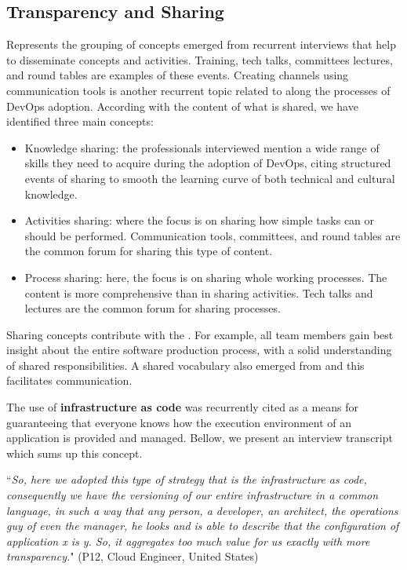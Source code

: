 \subsection{Transparency and Sharing} Represents the grouping of concepts
emerged from recurrent interviews that help to disseminate concepts and
activities. Training, tech talks, committees lectures, and round tables
are examples of these events. Creating
channels using communication tools is another recurrent topic
related to  along the processes of DevOps adoption.
According with the content of what is shared, we
have identified three main concepts:

\begin{itemize}
\item Knowledge sharing: the professionals interviewed mention a wide range of
skills they need to acquire during the adoption of DevOps, citing
structured events of sharing to smooth the learning curve of both technical and
cultural knowledge.


\item Activities sharing: where the focus is on sharing how simple tasks can or
should be performed. Communication tools, committees, and round tables are the common
forum for sharing this type of content.

\item Process sharing: here, the focus is on sharing whole working processes. The
content is more comprehensive than in sharing activities. Tech talks and
lectures are the common forum for sharing processes.

\end{itemize}

Sharing concepts contribute with the \cc. For example,
all team members gain best insight about the entire software production
process, with a solid understanding of shared responsibilities. A shared vocabulary also
emerged from  and this facilitates communication.

The use of \textbf{infrastructure as code} was
recurrently cited as a means for guaranteeing that everyone knows how the execution environment of
an application is provided and managed. Bellow, we present an interview
transcript which sums up this concept.

\begin{mq}
``\emph{So, here we adopted this type of strategy that is the infrastructure as code,
consequently we have the versioning of our entire infrastructure in a common
language, in such a way that any person, a developer, an architect, the
operations guy of even the manager, he looks and is able to describe that the
configuration of application x is y. So, it aggregates too much value for us
exactly with more transparency.}" (P12, Cloud Engineer, United States)
\end{mq}

